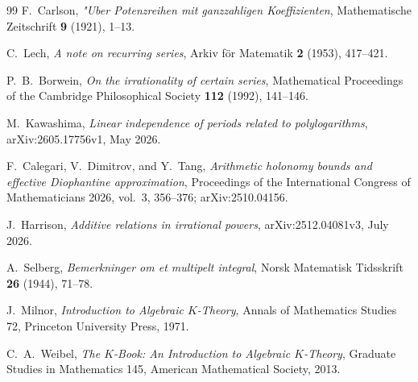 \documentclass[11pt,oneside]{article}
\theoremstyle{definition}
\theoremstyle{remark}
\begin{document}
\begin{thebibliography}{99}
F.~Carlson,
\newblock \emph{"Uber Potenzreihen mit ganzzahligen Koeffizienten},
\newblock Mathematische Zeitschrift \textbf{9} (1921), 1--13.

C.~Lech,
\newblock \emph{A note on recurring series},
\newblock Arkiv f\"or Matematik \textbf{2} (1953), 417--421.

P.~B.~Borwein,
\newblock \emph{On the irrationality of certain series},
\newblock Mathematical Proceedings of the Cambridge Philosophical Society
\textbf{112} (1992), 141--146.

M.~Kawashima,
\newblock \emph{Linear independence of periods related to polylogarithms},
\newblock arXiv:2605.17756v1, May 2026.

F.~Calegari, V.~Dimitrov, and Y.~Tang,
\newblock \emph{Arithmetic holonomy bounds and effective Diophantine approximation},
\newblock Proceedings of the International Congress of Mathematicians 2026, vol.~3,
356--376; arXiv:2510.04156.

J.~Harrison,
\newblock \emph{Additive relations in irrational powers},
\newblock arXiv:2512.04081v3, July 2026.

A.~Selberg,
\newblock \emph{Bemerkninger om et multipelt integral},
\newblock Norsk Matematisk Tidsskrift \textbf{26} (1944), 71--78.

J.~Milnor,
\newblock \emph{Introduction to Algebraic $K$-Theory},
\newblock Annals of Mathematics Studies 72, Princeton University Press, 1971.

C.~A.~Weibel,
\newblock \emph{The $K$-Book: An Introduction to Algebraic $K$-Theory},
\newblock Graduate Studies in Mathematics 145, American Mathematical Society, 2013.

\end{thebibliography}
\end{document}
